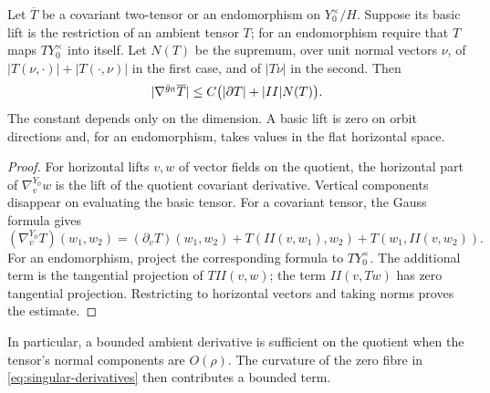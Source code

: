 \begin{lemma}\label{lem:basic-derivative}
Let $\overline T$ be a covariant two-tensor or an endomorphism
on $Y_0^\times/H$. Suppose its basic lift is the restriction of
an ambient tensor $T$; for an endomorphism require that $T$
maps $TY_0^\times$ into itself. Let $N(T)$ be the supremum,
over unit normal vectors $\nu$, of
$|T(\nu,\cdot)|+|T(\cdot,\nu)|$ in the first case, and of
$|T\nu|$ in the second. Then
\begin{equation}\label{eq:basic-derivative}
 |\nabla^{\bar g_{\mathrm{fl}}}\overline T|
 \le C\bigl(|\partial T|+|II|N(T)\bigr).
\end{equation}
The constant depends only on the dimension. A basic lift is zero
on orbit directions and, for an endomorphism, takes values in the
flat horizontal space.
\end{lemma}
\begin{proof}
For horizontal lifts $v,w$ of vector fields on the quotient,
the horizontal part of $\nabla^{Y_0}_vw$ is the lift of the
quotient covariant derivative. Vertical components disappear on
evaluating the basic tensor. For a covariant tensor, the Gauss
formula gives
\[
 (\nabla^{Y_0}_vT)(w_1,w_2)
 =(\partial_vT)(w_1,w_2)
   +T(II(v,w_1),w_2)+T(w_1,II(v,w_2)).
\]
For an endomorphism, project the corresponding formula to
$TY_0^\times$. The additional term is the tangential projection
of $TII(v,w)$; the term $II(v,Tw)$ has zero tangential
projection. Restricting to horizontal vectors and taking norms
proves the estimate.
\end{proof}

In particular, a bounded ambient derivative is sufficient on the
quotient when the tensor's normal components are $O(\rho)$.
The curvature of the zero fibre in \eqref{eq:singular-derivatives}
then contributes a bounded term.


